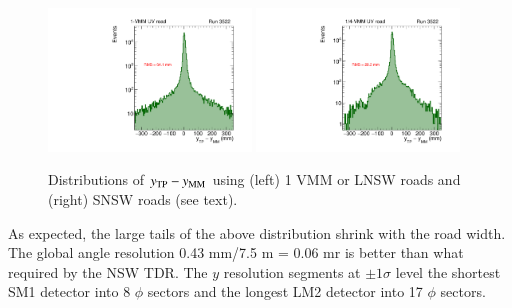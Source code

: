\begin{figure}[!htpb]
  \begin{center}
    \includegraphics[width=0.48\textwidth]{figures/gbtanalysis3522/TP_yres_1road.pdf}
    \includegraphics[width=0.48\textwidth]{figures/gbtanalysis3522/TP_yres_smallroad.pdf}
  \end{center}
  \vspace{-10pt}
  \caption{Distributions of $y_{\rm TP}-y_{\rm MM}$  using (left) 1 VMM or LNSW roads 
 and (right) SNSW roads (see text).}
  \label{fig:yres}
\end{figure}

 As expected, the large tails of the above distribution shrink with the road width.
 The global angle resolution 0.43 mm/7.5 m = 0.06 mr is better than what required by the NSW TDR.
  The $y$ resolution segments at $\pm 1 \sigma$ level the shortest  SM1 detector into 8  $\phi $ sectors and the longest LM2 detector
 into 17 $\phi $ sectors. 


